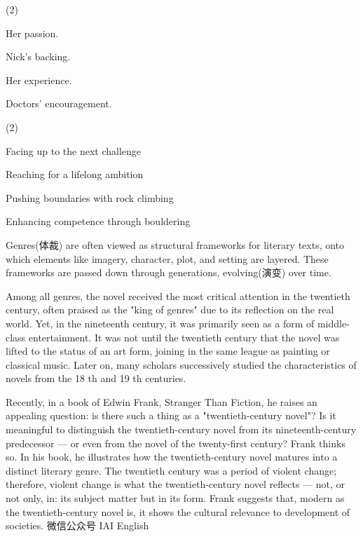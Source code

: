 \documentclass{英语试卷}
\begin{document}
\begin{choices}(2)
  \item Her passion.
  \item Nick's backing.
  \item Her experience.
  \item Doctors' encouragement.
\end{choices}
\begin{choices}(2)
  \item Facing up to the next challenge
  \item Reaching for a lifelong ambition
  \item Pushing boundaries with rock climbing
  \item Enhancing competence through bouldering
\end{choices}
\par Genres(体裁) are often viewed as structural frameworks for literary texts, onto which elements like imagery, character, plot, and setting are layered. These frameworks are passed down through generations, evolving(演变) over time.\par
\par Among all genres, the novel received the most critical attention in the twentieth century, often praised as the "king of genres" due to its reflection on the real world. Yet, in the nineteenth century, it was primarily seen as a form of middle-class entertainment. It was not until the twentieth century that the novel was lifted to the status of an art form, joining in the same league as painting or classical music. Later on, many scholars successively studied the characteristics of novels from the 18 th and 19 th centuries.\par
\par Recently, in a book of Edwin Frank, Stranger Than Fiction, he raises an appealing question: is there such a thing as a "twentieth-century novel"? Is it meaningful to distinguish the twentieth-century novel from its nineteenth-century predecessor — or even from the novel of the twenty-first century? Frank thinks so. In his book, he illustrates how the twentieth-century novel matures into a distinct literary genre. The twentieth century was a period of violent change; therefore, violent change is what the twentieth-century novel reflects — not, or not only, in: its subject matter but in its form. Frank suggests that, modern as the twentieth-century novel is, it shows the cultural relevance to development of societies. 微信公众号 IAI English\par
\end{document}
